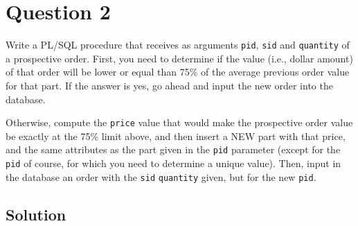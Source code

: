 
\section*{Question 2}

Write a PL/SQL procedure that receives as arguments \texttt{pid}, \texttt{sid} and \texttt{quantity} of a prospective order.
First, you need to determine if the value (i.e., dollar amount) of that order will be  lower or equal than 75\% of the average previous order value for that part.
If the answer is yes, go ahead and input the new order into the database.

Otherwise, compute the \texttt{price} value that would make the prospective order value be exactly at the 75\% limit above, and then insert a NEW part with that price, and the same attributes as the part given in the \texttt{pid} parameter (except  for the \texttt{pid} of course, for which you need to determine a unique value).
Then, input in the database an order with the \texttt{sid}  \texttt{quantity} given, but for the new \texttt{pid}.

\subsection*{Solution}

\lstset{language=SQL}

